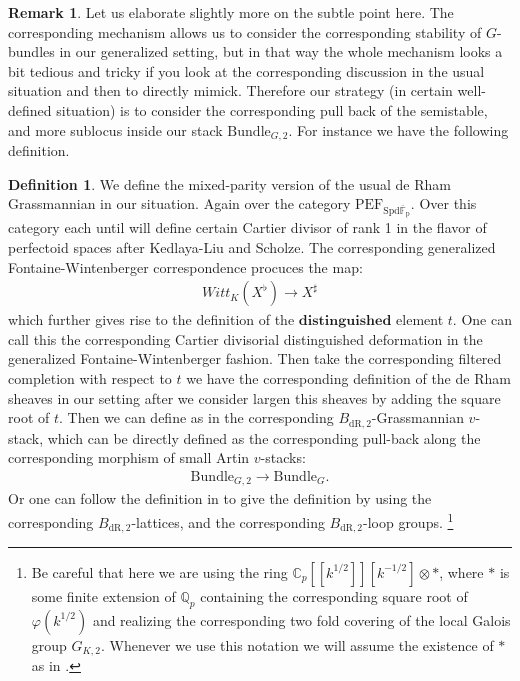 \documentclass[12pt]{book}
\theoremstyle{definition}
\newtheorem{definition}{Definition}
\newtheorem{remark}{Remark}
\begin{document}
\begin{remark}
Let us elaborate slightly more on the subtle point here. The corresponding mechanism allows us to consider the corresponding stability of $G$-bundles in our generalized setting, but in that way the whole mechanism looks a bit tedious and tricky if you look at the corresponding discussion in the usual situation and then to directly mimick. Therefore our strategy (in certain well-defined situation) is to consider the corresponding pull back of the semistable, and more sublocus inside our stack $\mathrm{Bundle}_{G,2}$. For instance we have the following definition.
\end{remark}


\begin{definition}
We define the mixed-parity version of the usual de Rham Grassmannian in our situation. Again over the category $\mathrm{PEF}_\mathrm{\mathrm{Spd}\overline{\mathbb{F}}_p}$. Over this category each until will define certain Cartier divisor of rank 1 in the flavor of perfectoid spaces after Kedlaya-Liu and Scholze. The corresponding generalized Fontaine-Wintenberger correspondence procuces the map:
\begin{align}
Witt_K(X^\flat) \rightarrow X^\sharp
\end{align}
which further gives rise to the definition of the $\mathbf{distinguished}$ element $t$. One can call this the corresponding Cartier divisorial distinguished deformation in the generalized Fontaine-Wintenberger fashion. Then take the corresponding filtered completion with respect to $t$ we have the corresponding definition of the de Rham sheaves in our setting after we consider largen this sheaves by adding the square root of $t$. Then we can define as in \cite{FS} the corresponding $B_\mathrm{dR,2}$-Grassmannian $v$-stack, which can be directly defined as the corresponding pull-back along the corresponding morphism of small Artin $v$-stacks:
\begin{align}
\mathrm{Bundle}_{G,2} \rightarrow \mathrm{Bundle}_{G}.
\end{align}
Or one can follow the definition in \cite{FS} to give the definition by using the corresponding $B_\mathrm{dR,2}$-lattices, and the corresponding $B_\mathrm{dR,2}$-loop groups. \footnote{Be careful that here we are using the ring $\mathbb{C}_p[[k^{1/2}]][k^{-1/2}]\otimes *$, where $*$ is some finite extension of $\mathbb{Q}_p$ containing the corresponding square root of $\varphi(k^{1/2})$ and realizing the corresponding two fold covering of the local Galois group $G_{K,2}$. Whenever we use this notation we will assume the existence of $*$ as in \cite{BS}.}
\end{definition}
\end{document}
